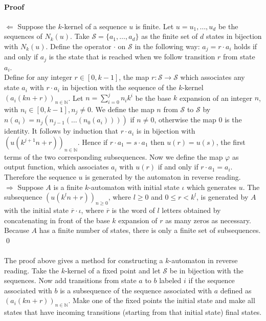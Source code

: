 \documentclass{article}
\begin{document}
\paragraph{Proof}
$\Leftarrow$ Suppose the $k$-kernel of a sequence $u$ is finite. Let
$u = u_1, \ldots, u_d$ be the sequences of $N_k(u)$. Take
$\mathcal{S} = \{a_1, \ldots, a_d\}$ as the finite set of $d$ states in 
bijection with $N_k(u)$. Define the operator $\cdot$ on $\mathcal{S}$ in 
the following way: $a_j = r \cdot a_i$ holds if and only if $a_j$ is the 
state that is reached when we follow transition $r$ from state $a_i$.\\
Define for any integer $r \in [0, k - 1]$, the map 
$r : \mathcal{S} \to \mathcal{S}$ which associates any state 
$a_i$ with $r \cdot a_i$ in bijection with the sequence of the $k$-kernel
$(a_i(kn + r))_{n \in \mathbb{N}}$. Let $n = \sum_{i = 0}^j n_i k^i$ be the 
base $k$ expansion of an integer $n$, with $n_i \in [0, k - 1], n_j \ne 0$.  
We define the map $n$ from
$\mathcal{S}$ to $\mathcal{S}$ by $n(a_i) = n_j(n_{j - 1}( \ldots (n_0(a_i))))$
if $n \ne 0$, otherwise the map 0 is the identity. It follows by induction that
$r \cdot a_i$ is in bijection with $(u(k^{j + 1} n + r))_{n \in \mathbb{N}}$. 
Hence if $r \cdot a_1 = s \cdot a_1$ then $u(r) = u(s)$, the first terms of the
two corresponding subsequences. Now we define the map $\varphi$ as output 
function, which associates $a_i$ with $u(r)$ if and only if 
$r \cdot a_1 = a_i$. Therefore the sequence $u$ is generated by the automaton 
in reverse reading.\\
$\Rightarrow$ Suppose $A$ is a finite $k$-automaton with initial state $\iota$
which generates $u$. The subsequence $(u(k^ln + r))_{n \ge 0}$, where
$l \ge 0$ and $0 \le r < k^l$, is generated by $A$ with the initial state
$\overline{r} \cdot \iota$, where $\overline{r}$ is the word of $l$ letters
obtained by concatenating in front of the base $k$ expansion of $r$ as many
zeros as necessary. Because $A$ has a finite number of states, there is only a
finite set of subsequences. \qed\\
\\
The proof above gives a method for constructing a $k$-automaton in reverse
reading. Take the $k$-kernel of a fixed point and let $\mathcal{S}$ be in
bijection with the sequences. Now add transitions from state $a$ to $b$
labeled $i$ if the sequence associated with $b$ is a subsequence of the
sequence associated with $a$ defined as $(a_i(kn + r))_{n \in \mathbb{N}}$.
Make one of the fixed points the initial state and make all states that have
incoming transitions (starting from that initial state) final states.
\end{document}
